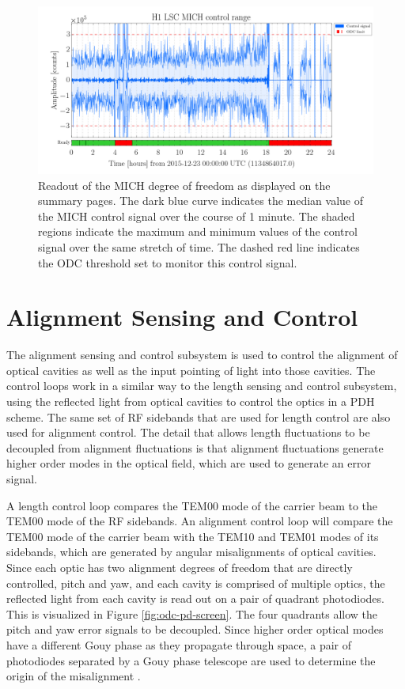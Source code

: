 \begin{figure}[ht!]
\includegraphics[width=\textwidth]{figures/ODC/H1-MICH-SUMMARY-PAGES}
\caption[MICH control signal on summary pages]{Readout of the MICH degree of freedom as %
         displayed on the summary pages. The dark blue curve indicates the median value of %
         the MICH control signal over the course of 1 minute. The shaded regions indicate %
         the maximum and minimum values of the control signal over the same stretch of time. %
         The dashed red line indicates the ODC threshold set to monitor this control signal.}
\label{fig:mich-summary-pages}
\end{figure}

\section{Alignment Sensing and Control}

The alignment sensing and control subsystem is used to control the alignment of 
optical cavities as well as the input pointing of light into those cavities. 
The control loops work in a similar way to the length sensing and control subsystem, 
using the reflected light from optical cavities to control the optics in a PDH 
scheme. The same set of RF sidebands that are used for length control are also used 
for alignment control. The detail that allows length fluctuations to be decoupled from 
alignment fluctuations is that alignment fluctuations generate higher order 
modes in the optical field, which are used to 
generate an error signal.

A length control loop compares the TEM00 mode of the carrier beam to the TEM00 
mode of the RF sidebands. 
An alignment control loop will compare the TEM00 mode of the carrier 
beam with the TEM10 and TEM01 modes of its sidebands, which are generated by 
angular misalignments of optical cavities. 
Since each optic has two alignment degrees of freedom that are directly 
controlled, pitch and yaw, and each cavity is comprised of multiple optics, 
the reflected light from each cavity is read out on a 
pair of quadrant photodiodes. This is visualized in Figure \ref{fig:odc-pd-screen}. 
The four quadrants allow the pitch and yaw error 
signals to be decoupled. Since higher order optical modes have a different Gouy 
phase as they propagate through space, a pair of photodiodes separated by a Gouy 
phase telescope are used to determine the origin of the misalignment 
\cite{NergisThesis}.

